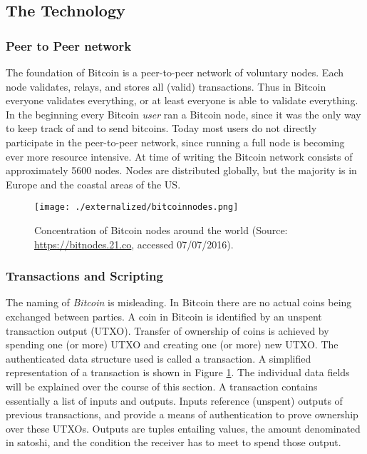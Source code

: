 \subsection{The Technology}
\label{sec:btc_tech}

\subsubsection{Peer to Peer network}
\label{sec:p2p}

The foundation of Bitcoin is a peer-to-peer network of voluntary nodes. Each node validates, relays, and stores all (valid) transactions. Thus in Bitcoin everyone validates everything, or at least everyone is able to validate everything. In the beginning every Bitcoin \emph{user} ran a Bitcoin node, since it was the only way to keep track of and to send bitcoins. Today most users do not directly participate in the peer-to-peer network, since running a full node is becoming ever more resource intensive. At time of writing the Bitcoin network consists of approximately 5600 nodes. Nodes are distributed globally, but the majority is in Europe and the coastal areas of the US. 

\begin{figure}
\centering
\texttt{[image: ./externalized/bitcoinnodes.png]}
\caption{Concentration of Bitcoin nodes around the world (Source: \url{https://bitnodes.21.co}, accessed 07/07/2016).}
\label{fig:bitcointx}
\end{figure}

\cite{DonetDonet2014}


\subsubsection{Transactions and Scripting}
\label{sec:tx}

The naming of \emph{Bitcoin} is misleading. In Bitcoin there are no actual coins being exchanged between parties. A coin in Bitcoin is identified by an unspent transaction output (UTXO). Transfer of ownership of coins is achieved by spending one (or more) UTXO and creating one (or more) new UTXO.
The authenticated data structure used is called a transaction. A simplified representation of a transaction is shown in Figure \ref{fig:bitcointx}. The individual data fields will be explained over the course of this section.
 A transaction contains essentially a list of inputs and outputs. Inputs reference (unspent) outputs of previous transactions, and provide a means of authentication to prove ownership over these UTXOs. Outputs are tuples entailing values, the amount denominated in satoshi, and the condition the receiver has to meet to spend those output. 

